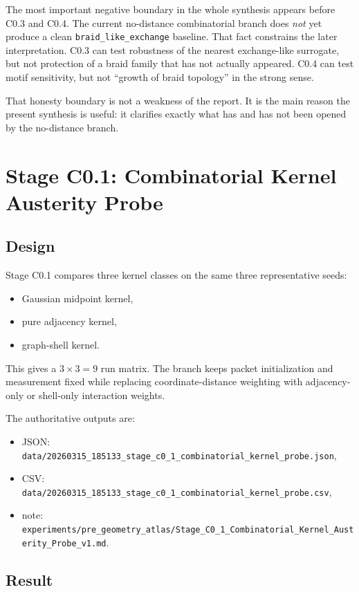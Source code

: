 \documentclass[11pt]{article}
\begin{document}
The most important negative boundary in the whole synthesis appears before C0.3 and C0.4. The current no-distance combinatorial branch does \emph{not} yet produce a clean \texttt{braid\_like\_exchange} baseline. That fact constrains the later interpretation. C0.3 can test robustness of the nearest exchange-like surrogate, but not protection of a braid family that has not actually appeared. C0.4 can test motif sensitivity, but not ``growth of braid topology'' in the strong sense.

That honesty boundary is not a weakness of the report. It is the main reason the present synthesis is useful: it clarifies exactly what has and has not been opened by the no-distance branch.

\section{Stage C0.1: Combinatorial Kernel Austerity Probe}

\subsection{Design}

Stage C0.1 compares three kernel classes on the same three representative seeds:
\begin{itemize}
\item Gaussian midpoint kernel,
\item pure adjacency kernel,
\item graph-shell kernel.
\end{itemize}
This gives a $3 \times 3 = 9$ run matrix. The branch keeps packet initialization and measurement fixed while replacing coordinate-distance weighting with adjacency-only or shell-only interaction weights.

The authoritative outputs are:
\begin{itemize}
\item JSON: \texttt{data/20260315\_185133\_stage\_c0\_1\_combinatorial\_kernel\_probe.json},
\item CSV: \texttt{data/20260315\_185133\_stage\_c0\_1\_combinatorial\_kernel\_probe.csv},
\item note: \texttt{experiments/pre\_geometry\_atlas/Stage\_C0\_1\_Combinatorial\_Kernel\_Austerity\_Probe\_v1.md}.
\end{itemize}

\subsection{Result}
\end{document}
